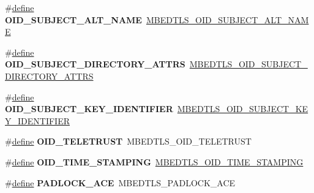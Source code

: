 \begin{DoxyCompactItemize}
\item 
\mbox{\label{compat-1_83_8h_afd2b89d58fe5192c94b67248c1815958}} 
\#\hyperlink{structdefine}{define} {\bfseries O\+I\+D\+\_\+\+S\+U\+B\+J\+E\+C\+T\+\_\+\+A\+L\+T\+\_\+\+N\+A\+ME}~\hyperlink{oid_8h_a03c23655749d213fb26e608d7d0b952c}{M\+B\+E\+D\+T\+L\+S\+\_\+\+O\+I\+D\+\_\+\+S\+U\+B\+J\+E\+C\+T\+\_\+\+A\+L\+T\+\_\+\+N\+A\+ME}
\item 
\mbox{\label{compat-1_83_8h_af25a030a9cd161912e58b50287da25ea}} 
\#\hyperlink{structdefine}{define} {\bfseries O\+I\+D\+\_\+\+S\+U\+B\+J\+E\+C\+T\+\_\+\+D\+I\+R\+E\+C\+T\+O\+R\+Y\+\_\+\+A\+T\+T\+RS}~\hyperlink{oid_8h_a1bc877b377f188063914019663920ce4}{M\+B\+E\+D\+T\+L\+S\+\_\+\+O\+I\+D\+\_\+\+S\+U\+B\+J\+E\+C\+T\+\_\+\+D\+I\+R\+E\+C\+T\+O\+R\+Y\+\_\+\+A\+T\+T\+RS}
\item 
\mbox{\label{compat-1_83_8h_a2f5bd13e656c8ce94e03f2ed0f102355}} 
\#\hyperlink{structdefine}{define} {\bfseries O\+I\+D\+\_\+\+S\+U\+B\+J\+E\+C\+T\+\_\+\+K\+E\+Y\+\_\+\+I\+D\+E\+N\+T\+I\+F\+I\+ER}~\hyperlink{oid_8h_a698cce56e06194d62bf49201e44dc5d8}{M\+B\+E\+D\+T\+L\+S\+\_\+\+O\+I\+D\+\_\+\+S\+U\+B\+J\+E\+C\+T\+\_\+\+K\+E\+Y\+\_\+\+I\+D\+E\+N\+T\+I\+F\+I\+ER}
\item 
\mbox{\label{compat-1_83_8h_a0cd5084a00692c7f2e5e07bc165c82dc}} 
\#\hyperlink{structdefine}{define} {\bfseries O\+I\+D\+\_\+\+T\+E\+L\+E\+T\+R\+U\+ST}~M\+B\+E\+D\+T\+L\+S\+\_\+\+O\+I\+D\+\_\+\+T\+E\+L\+E\+T\+R\+U\+ST
\item 
\mbox{\label{compat-1_83_8h_a40f5cf7dced28c57cd3b699255a57493}} 
\#\hyperlink{structdefine}{define} {\bfseries O\+I\+D\+\_\+\+T\+I\+M\+E\+\_\+\+S\+T\+A\+M\+P\+I\+NG}~\hyperlink{oid_8h_aa4758a9869e5160037e4a1f9327738ed}{M\+B\+E\+D\+T\+L\+S\+\_\+\+O\+I\+D\+\_\+\+T\+I\+M\+E\+\_\+\+S\+T\+A\+M\+P\+I\+NG}
\item 
\mbox{\label{compat-1_83_8h_ad86fbf3f26cdf77a953d43eb379db66c}} 
\#\hyperlink{structdefine}{define} {\bfseries P\+A\+D\+L\+O\+C\+K\+\_\+\+A\+CE}~M\+B\+E\+D\+T\+L\+S\+\_\+\+P\+A\+D\+L\+O\+C\+K\+\_\+\+A\+CE
\item 
\mbox{\label{compat-1_83_8h_a52b6ff733d6d9b29dcb62d805026cb7f}} 

\end{DoxyCompactItemize}
